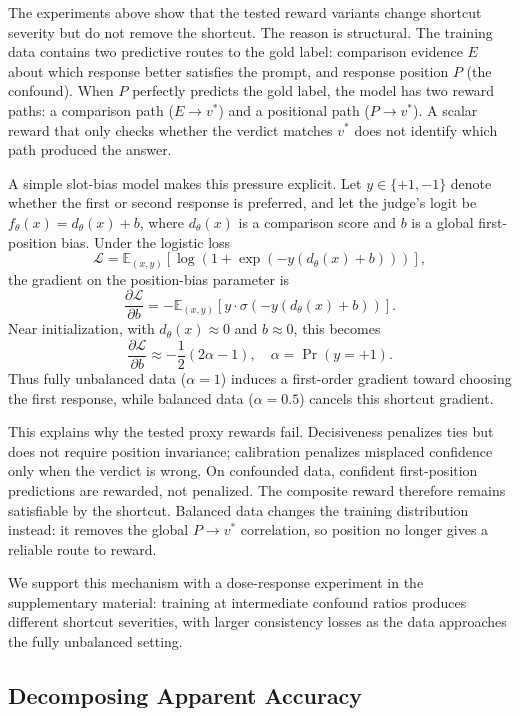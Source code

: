 \documentclass[letterpaper]{article}
\begin{document}
The experiments above show that the tested reward variants change shortcut severity but do not remove the shortcut. The reason is structural. The training data contains two predictive routes to the gold label: comparison evidence $E$ about which response better satisfies the prompt, and response position $P$ (the confound). When $P$ perfectly predicts the gold label, the model has two reward paths: a comparison path ($E \to v^*$) and a positional path ($P \to v^*$). A scalar reward that only checks whether the verdict matches $v^*$ does not identify which path produced the answer.

A simple slot-bias model makes this pressure explicit. Let $y \in \{+1, -1\}$ denote whether the first or second response is preferred, and let the judge's logit be $f_\theta(x) = d_\theta(x) + b$, where $d_\theta(x)$ is a comparison score and $b$ is a global first-position bias. Under the logistic loss
\[
\mathcal{L} =
\mathbb{E}_{(x,y)}
\left[\log \left(1 + \exp \left(-y(d_\theta(x)+b)\right)\right)\right],
\]
the gradient on the position-bias parameter is
\[
\frac{\partial \mathcal{L}}{\partial b}
= -\mathbb{E}_{(x,y)}
\left[y \cdot \sigma\left(-y(d_\theta(x)+b)\right)\right].
\]
Near initialization, with $d_\theta(x) \approx 0$ and $b \approx 0$, this becomes
\[
\frac{\partial \mathcal{L}}{\partial b}
\approx -\frac{1}{2}(2\alpha - 1),
\quad
\alpha = \Pr(y = +1).
\]
Thus fully unbalanced data ($\alpha = 1$) induces a first-order gradient toward choosing the first response, while balanced data ($\alpha = 0.5$) cancels this shortcut gradient.

This explains why the tested proxy rewards fail. Decisiveness penalizes ties but does not require position invariance; calibration penalizes misplaced confidence only when the verdict is wrong. On confounded data, confident first-position predictions are rewarded, not penalized. The composite reward therefore remains satisfiable by the shortcut. Balanced data changes the training distribution instead: it removes the global $P \to v^*$ correlation, so position no longer gives a reliable route to reward.

We support this mechanism with a dose-response experiment in the supplementary material: training at intermediate confound ratios produces different shortcut severities, with larger consistency losses as the data approaches the fully unbalanced setting.

\subsection{Decomposing Apparent Accuracy}
\end{document}
